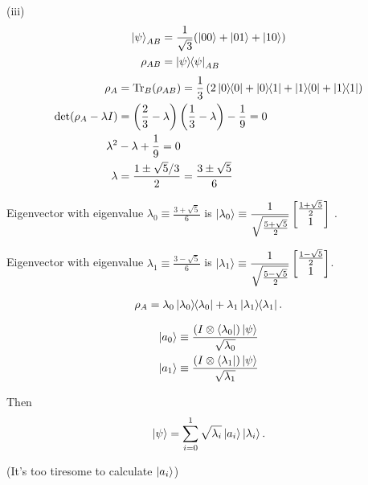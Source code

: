 (iii)
\begin{align*}
	\ket{\psi}_{AB} &= \frac{1}{\sqrt{3}} (\ket{00} + \ket{01} + \ket{10})\\
	\rho_{AB} &= \ket{\psi}\hspace{-1mm} \bra{\psi}_{AB}
\end{align*}
%
%
%
\begin{align*}
	\rho_A &= \operatorname{Tr}_B (\rho_{AB}) = \frac{1}{3} \left( 2\ket{0}\hspace{-1mm} \bra{0} + \ket{0}\hspace{-1mm} \bra{1} + \ket{1}\hspace{-1mm} \bra{0} + \ket{1}\hspace{-1mm} \bra{1} \right)\\
	\det (\rho_A - \lambda I) &= \left( \frac{2}{3} - \lambda \right) \left( \frac{1}{3} - \lambda \right) - \frac{1}{9} = 0\\
	\lambda^2 &- \lambda + \frac{1}{9} = 0\\
	\lambda &= \frac{1 \pm \sqrt{5} / 3}{2} = \frac{3 \pm \sqrt{5}}{6}
\end{align*}



Eigenvector with eigenvalue $\displaystyle \lambda_0 \equiv \frac{3 + \sqrt{5}}{6}$ is $\displaystyle \ket{\lambda_0} \equiv \frac{1}{\sqrt{\frac{5 + \sqrt{5}}{2}}} \begin{bmatrix}
    \frac{1 + \sqrt{5}}{2} \\
    1
\end{bmatrix}$ .

Eigenvector with eigenvalue $\displaystyle \lambda_1 \equiv \frac{3 - \sqrt{5}}{6}$ is $\displaystyle \ket{\lambda_1} \equiv \frac{1}{\sqrt{\frac{5 - \sqrt{5}}{2}}} \begin{bmatrix}
    \frac{1 - \sqrt{5}}{2} \\
    1
\end{bmatrix} $.

\begin{align*}
	\rho_A = \lambda_0 \ket{\lambda_0}\hspace{-1mm} \bra{\lambda_0} + \lambda_1 \ket{\lambda_1}\hspace{-1mm} \bra{\lambda_1}.
\end{align*}


\begin{align*}
	\ket{a_0} \equiv \frac{(I \otimes \bra{\lambda_0}) \ket{\psi} }{\sqrt{\lambda_0}}\\
	\ket{a_1} \equiv \frac{(I \otimes \bra{\lambda_1}) \ket{\psi} }{\sqrt{\lambda_1}}
\end{align*}

Then
\begin{align*}
	\ket{\psi} = \sum_{i=0}^1 \sqrt{\lambda_i} \ket{a_i} \ket{\lambda_i}.
\end{align*}


(It's too tiresome to calculate $\ket{a_i}$)



